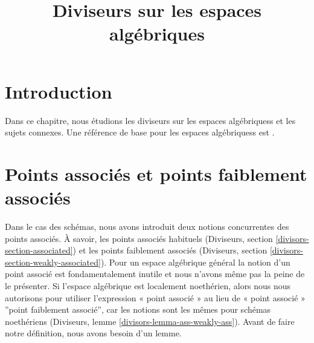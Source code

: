 

%


\title{Diviseurs sur les espaces algébriques}


\maketitle

\label{section-phantom}

\tableofcontents

\section{Introduction}
\label{section-introduction}

\noindent
Dans ce chapitre, nous étudions les diviseurs sur les espaces algébriquess et les sujets connexes.
Une référence de base pour les espaces algébriquess est \cite{Kn}.









\section{Points associés et points faiblement associés}
\label{section-associated}

\noindent
Dans le cas des schémas, nous avons introduit deux notions concurrentes
des points associés. À savoir, les points associés habituels
(Diviseurs, section \ref{divisors-section-associated})
et les points faiblement associés
(Diviseurs, section \ref{divisors-section-weakly-associated}).
Pour un espace algébrique général la notion d'un point associé
est fondamentalement inutile et nous n'avons même pas la peine de le présenter.
Si l'espace algébrique est localement noethérien, alors nous nous autorisons
pour utiliser l'expression « point associé » au lieu de « point associé »
''point faiblement associé'', car les notions sont les mêmes pour
schémas noethériens (Diviseurs, lemme \ref{divisors-lemma-ass-weakly-ass}).
Avant de faire notre définition, nous avons besoin d'un lemme.

